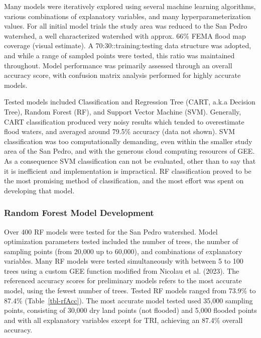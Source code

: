 \documentclass[
]{agujournal2019}
\begin{document}
Many models were iteratively explored using several machine learning
algorithms, various combinations of explanatory variables, and many
hyperparameterization values. For all initial model trials the study
area was reduced to the San Pedro watershed, a well characterized
watershed with approx. 66\% FEMA flood map coverage (visual estimate). A
70:30::training:testing data structure was adopted, and while a range of
sampled points were tested, this ratio was maintained throughout. Model
performance was primarily assessed through an overall accuracy score,
with confusion matrix analysis performed for highly accurate models.

Tested models included Classification and Regression Tree (CART, a.k.a
Decision Tree), Random Forest (RF), and Support Vector Machine (SVM).
Generally, CART classification produced very noisy results which tended
to overestimate flood waters, and averaged around 79.5\% accuracy (data
not shown). SVM classification was too computationally demanding, even
within the smaller study area of the San Pedro, and with the generous
cloud computing resources of GEE. As a consequence SVM classification
can not be evaluated, other than to say that it is inefficient and
implementation is impractical. RF classification proved to be the most
promising method of classification, and the most effort was spent on
developing that model.

\subsubsection{Random Forest Model
Development}\label{random-forest-model-development}

Over 400 RF models were tested for the San Pedro watershed. Model
optimization parameters tested included the number of trees, the number
of sampling points (from 20,000 up to 60,000), and combinations of
explanatory variables. Many RF models were tested simultaneously with
between 5 to 100 trees using a custom GEE function modified from Nicolau
et al. (2023). The referenced accuracy scores for preliminary models
refers to the most accurate model, using the fewest number of trees.
Tested RF models ranged from 73.9\% to 87.4\% (Table~\ref{tbl-rfAcc}).
The most accurate model tested used 35,000 sampling points, consisting
of 30,000 dry land points (not flooded) and 5,000 flooded points and
with all explanatory variables except for TRI, achieving an 87.4\%
overall accuracy.
\end{document}
